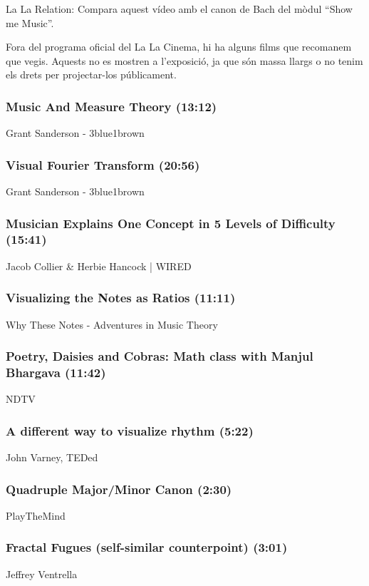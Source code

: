 La La Relation: Compara aquest vídeo amb el canon de Bach del mòdul ``Show me Music''.


Fora del programa oficial del La La Cinema, hi ha alguns films que recomanem que vegis. Aquests no es mostren a l'exposició, ja que són massa llargs o no tenim els drets per projectar-los públicament.

\subsubsection*{Music And Measure Theory (13:12)}
Grant Sanderson - 3blue1brown

\subsubsection*{Visual Fourier Transform (20:56)}
Grant Sanderson - 3blue1brown

\subsubsection*{Musician Explains One Concept in 5 Levels of Difficulty (15:41)}
Jacob Collier \& Herbie Hancock | WIRED

\subsubsection*{Visualizing the Notes as Ratios (11:11)}
Why These Notes - Adventures in Music Theory

\subsubsection*{Poetry, Daisies and Cobras: Math class with Manjul Bhargava (11:42)}
NDTV

\subsubsection*{A different way to visualize rhythm (5:22)}
John Varney, TEDed

\subsubsection*{Quadruple Major/Minor Canon (2:30)}
PlayTheMind

\subsubsection*{Fractal Fugues (self-similar counterpoint) (3:01)}
Jeffrey Ventrella

